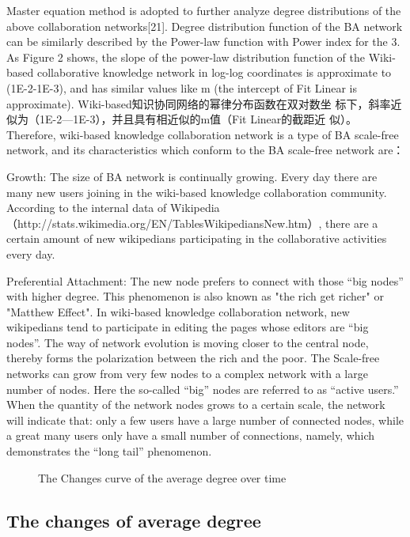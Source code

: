 \documentclass{elsarticle}
\begin{document}
Master equation method is adopted to further analyze degree
distributions of the above collaboration networks[21]. Degree
distribution function of the BA network can be similarly described by
the Power-law function with Power index for the 3. As Figure 2 shows,
the slope of the power-law distribution function of the Wiki-based
collaborative knowledge network in log-log coordinates is approximate
to (1E-2-1E-3), and has similar values like m (the intercept of Fit
Linear is approximate). Wiki-based知识协同网络的幂律分布函数在双对数坐
标下，斜率近似为（1E-2—1E-3），并且具有相近似的m值（Fit Linear的截距近
似）。Therefore, wiki-based knowledge collaboration network is a type
of BA scale-free network, and its characteristics which conform to the
BA scale-free network are：

Growth: The size of BA network is continually growing. Every day there
are many new users joining in the wiki-based knowledge collaboration
community. According to the internal data of
Wikipedia（http://stats.wikimedia.org/EN/TablesWikipediansNew.htm）,
there are a certain amount of new wikipedians participating in the
collaborative activities every day. 

Preferential Attachment: The new node prefers to connect with those
“big nodes” with higher degree. This phenomenon is also known as "the
rich get richer" or "Matthew Effect". In wiki-based knowledge
collaboration network, new wikipedians tend to participate in editing
the pages whose editors are “big nodes”. The way of network evolution
is moving closer to the central node, thereby forms the polarization
between the rich and the poor. The Scale-free networks can grow from
very few nodes to a complex network with a large number of nodes. Here
the so-called “big” nodes are referred to as “active users.” When the
quantity of the network nodes grows to a certain scale, the network
will indicate that: only a few users have a large number of connected
nodes, while a great many users only have a small number of
connections, namely, which demonstrates the “long tail” phenomenon. 

\begin{figure}[htpb]
  \centering
  \scalebox{0.3}{\texttt{[image: 03]}}
  \caption{The Changes curve of the average degree over time}
\end{figure}

\subsection{The changes of average degree}
\label{sec:chang-aver-degr}
\end{document}
